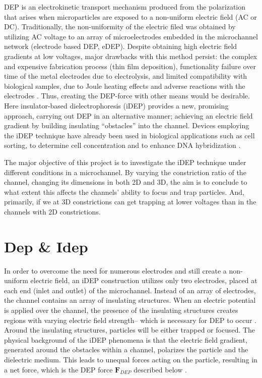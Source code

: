 \documentclass[journal, a4paper]{IEEEtran}
\begin{document}
DEP is an electrokinetic transport mechanism produced from the polarization that arises when microparticles are exposed to a non-uniform electric field (AC or DC).  Traditionally, the non-uniformity of the electric filed was obtained by utilizing AC voltage to an array of microelectrodes embedded in the microchannel network (electrode based DEP, eDEP). Despite obtaining high electric field gradients at low voltages, major drawbacks with this method persist: the complex and expensive fabrication process (thin film deposition), functionality failure over time of the metal electrodes due to electrolysis, and limited compatibility with biological samples, due to Joule heating effects and adverse reactions with the electrodes \cite{Braff:12,cheri2014}. Thus, creating the DEP-force with other means would be desirable. Here insulator-based dielectrophoresis (iDEP) provides a new, promising approach, carrying out DEP in an alternative manner; achieving an electric field gradient by building insulating  “obstacles” into the channel. Devices employing the iDEP technique have already been used in biological applications such as cell sorting, to determine cell concentration and to enhance DNA hybridization \cite{Braff:12}.

The major objective of this project is to investigate the iDEP technique under different conditions in a microchannel. By varying the constriction ratio of the channel, changing its dimensions in both 2D and 3D, the aim is to conclude to what extent this affects the channels’ ability to focus and trap particles. And, primarily, if we at 3D constrictions can get trapping at lower voltages than in the channels with 2D constrictions.


\section{Dep \& Idep}
In order to overcome the need for numerous electrodes and still create a non-uniform electric field, an iDEP construction utilizes only two electrodes, placed at each end (inlet and outlet) of the microchannel.  Instead of an array of electrodes, the channel contains an array of insulating structures. When an electric potential is applied over the channel, the presence of the insulating structures creates regions with varying electric field strength– which is necessary for DEP to occur \cite{martinez2009}.  Around the insulating structures, particles will be either trapped or focused. 
The physical background of the iDEP phenomena is that the electric field gradient, generated around the obstacles within a channel, polarizes the particle and the dielectric medium. This leads to unequal forces acting on the particle, resulting in a net force, which is the DEP force $\mathbf{F}_{DEP}$ described below \cite{pethig1997}. 
\end{document}
